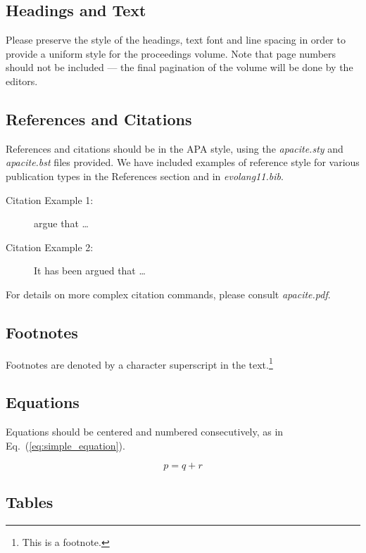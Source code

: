 \documentclass{evolang11}
\begin{document}
\subsection{Headings and Text}

Please preserve the style of the headings, text font and line spacing
in order to provide a uniform style for the proceedings volume.  Note
that page numbers should not be included --- the final pagination of
the volume will be done by the editors.


\subsection{References and Citations}

References and citations should be in the APA style, using the {\em
  apacite.sty} and {\em apacite.bst} files provided.  We have included
examples of reference style for various publication types in the
References section and in {\em evolang11.bib}.

\begin{description}
\item [Citation Example 1:]  argue that \ldots
\item [Citation Example 2:] It has been argued \cite{pinker_90_natural} that \ldots
\end{description}
\nocite{tomasello_03_constructing,hauser_03_uniquely}

For details on more complex citation commands, please consult {\em apacite.pdf}.

\subsection{Footnotes}

Footnotes are denoted by a character superscript in the
text.\footnote{This is a footnote.}

\subsection{Equations}

Equations should be centered and numbered consecutively, as in
Eq.~(\ref{eq:simple_equation}).

\begin{equation}
p = q + r
\label{eq:simple_equation}
\end{equation}

\subsection{Tables}
\end{document}
